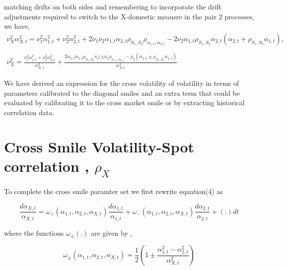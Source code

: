\documentclass[12pt]{article}
\begin{document}
matching drifts on both sides and remembering to incorporate the drift adjustments required to switch to the X-domestic meausre in the pair 2 processes, we have,
\begin{multline}
  \nu^2_X\alpha^2_{X,t} = \nu^2_1\alpha^2_{1,t} + \nu^2_2\alpha^2_{2,t} + 2\nu_1\nu_2\alpha_{1,t}\alpha_{2,t}\rho_{S_1,S_2}\rho_{\alpha_{1,t},\alpha_{2,t}} - 2\nu_2\alpha_{1,t}\rho_{S_1,S_2}\alpha_{2,t}(\alpha_{2,t} + \rho_{S_1,S_2}\alpha_{1,t}), \\ \\
  \nu^2_X = \frac{\nu^2_1\alpha^2_{1,t} + \nu^2_2\alpha^2_{2,t}}{\alpha^2_{X,t}} +
  \frac{2\alpha_{1,t}\alpha_{2,t}\rho_{S_1,S_2}\nu_2(\pm\nu_1\rho_{\alpha_{1,t},\alpha_{2,t}} - \rho_2(\alpha_{2,t} \pm \rho_{S_1,S_2}\alpha_{1,t})}{\alpha^2_{X,t}}
\end{multline}

We have derived an expression for the cross volatility of volatility in terms of parameters calibrated to the diagonal smiles and an extra term
that could be evaluated by calibrating it to the cross market smile  or by extracting historical correlation data.



\section{Cross Smile Volatility-Spot correlation , $\rho_X$}

To complete the cross smile paramter set we first rewrite equation(4) as

\begin{equation}
  \frac{d \alpha_{X,t}}{\alpha_{X,t}} = \omega_{+}(\alpha_{1,t},\alpha_{2,t},\alpha_{X,t}) \frac{d \alpha_{1,t}}{\alpha_{1,t}} + \omega_{-}(\alpha_{1,t},\alpha_{2,t},\alpha_{X,t}) \frac{d \alpha_{2,t}}{\alpha_{2,t}} + (.)dt
\end{equation}

where the functions $\omega_{\pm}(.)$ are given by ,

\begin{equation}
\omega_{\pm} (\alpha_{1,t},\alpha_{2,t},\alpha_{X,t})  = \frac{1}{2} (1 \pm \frac{\alpha^2_{1,t} - \alpha^2_{2,t}}{\alpha^2_{X,t}})
\end{equation}
\end{document}
